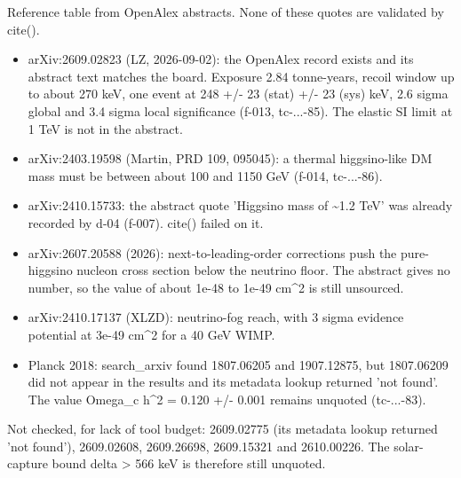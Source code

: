 \documentclass[11pt,a4paper]{article}
\begin{document}
Reference table from OpenAlex abstracts. None of these quotes are validated by cite().

\begin{itemize}
  \item arXiv:2609.02823 (LZ, 2026-09-02): the OpenAlex record exists and its abstract text matches the board. Exposure 2.84 tonne-years, recoil window up to about 270 keV, one event at 248 +/- 23 (stat) +/- 23 (sys) keV, 2.6 sigma global and 3.4 sigma local significance (f-013, tc-...-85). The elastic SI limit at 1 TeV is not in the abstract.
  \item arXiv:2403.19598 (Martin, PRD 109, 095045): a thermal higgsino-like DM mass must be between about 100 and 1150 GeV (f-014, tc-...-86).
  \item arXiv:2410.15733: the abstract quote 'Higgsino mass of \textasciitilde{}1.2 TeV' was already recorded by d-04 (f-007). cite() failed on it.
  \item arXiv:2607.20588 (2026): next-to-leading-order corrections push the pure-higgsino nucleon cross section below the neutrino floor. The abstract gives no number, so the value of about 1e-48 to 1e-49 cm\textasciicircum{}2 is still unsourced.
  \item arXiv:2410.17137 (XLZD): neutrino-fog reach, with 3 sigma evidence potential at 3e-49 cm\textasciicircum{}2 for a 40 GeV WIMP.
  \item Planck 2018: search\_arxiv found 1807.06205 and 1907.12875, but 1807.06209 did not appear in the results and its metadata lookup returned 'not found'. The value Omega\_c h\textasciicircum{}2 = 0.120 +/- 0.001 remains unquoted (tc-...-83).
\end{itemize}
Not checked, for lack of tool budget: 2609.02775 (its metadata lookup returned 'not found'), 2609.02608, 2609.26698, 2609.15321 and 2610.00226. The solar-capture bound delta \textgreater{} 566 keV is therefore still unquoted.
\end{document}
